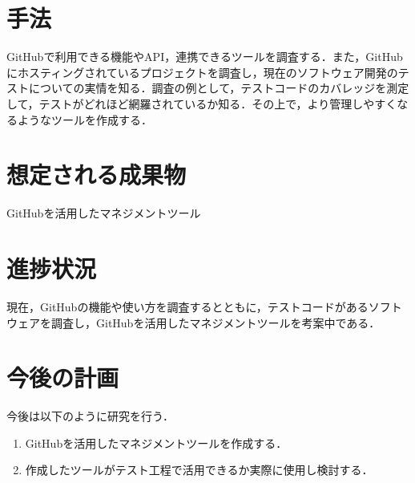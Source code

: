\documentclass[uplatex,twocolumn,dvipdfmx]{jsarticle}
\begin{document}
\section{手法}

GitHubで利用できる機能やAPI，連携できるツールを調査する．また，GitHubにホスティングされているプロジェクトを調査し，現在のソフトウェア開発のテストについての実情を知る．調査の例として，テストコードのカバレッジを測定して，テストがどれほど網羅されているか知る．その上で，より管理しやすくなるようなツールを作成する．

\section{想定される成果物}

GitHubを活用したマネジメントツール

\section{進捗状況}

現在，GitHubの機能や使い方を調査するとともに，テストコードがあるソフトウェアを調査し，GitHubを活用したマネジメントツールを考案中である．

\section{今後の計画}

今後は以下のように研究を行う．
\begin{enumerate}
\item GitHubを活用したマネジメントツールを作成する．
\item 作成したツールがテスト工程で活用できるか実際に使用し検討する．
\end{enumerate}


\end{document}
